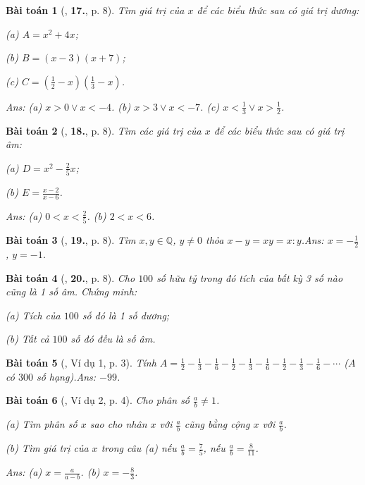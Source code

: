 \documentclass{article}
\numberwithin{equation}{section}
\newtheorem{baitoan}{Bài toán}
\begin{document}
\begin{baitoan}[\cite{Tuyen_Toan_7}, \textbf{17.}, p. 8]
	Tìm giá trị của $x$ để các biểu thức sau có giá trị dương:
	\begin{enumerate*}
		\item[(a)] $A = x^2 + 4x$;
		\item[(b)] $B = (x - 3)(x + 7)$;
		\item[(c)] $C = \left(\frac{1}{2} - x\right)\left(\frac{1}{3} - x\right)$.
	\end{enumerate*}\hfill\textsf{Ans:} (a) $x > 0\lor x < -4$. (b) $x > 3\lor x < -7$. (c) $x < \frac{1}{3}\lor x > \frac{1}{2}$.
\end{baitoan}

\begin{baitoan}[\cite{Tuyen_Toan_7}, \textbf{18.}, p. 8]
	Tìm các giá trị của $x$ để các biểu thức sau có giá trị âm:
	\begin{enumerate*}
		\item[(a)] $D = x^2 - \frac{2}{5}x$;
		\item[(b)] $E = \frac{x - 2}{x - 6}$.
	\end{enumerate*}\hfill\textsf{Ans:} (a) $0 < x < \frac{2}{5}$. (b) $2 < x < 6$.
\end{baitoan}

\begin{baitoan}[\cite{Tuyen_Toan_7}, \textbf{19.}, p. 8]
	Tìm $x,y\in\mathbb{Q}$, $y\ne 0$ thỏa $x - y = xy = x:y$.\hfill\textsf{Ans:} $x = -\frac{1}{2}$, $y = -1$.
\end{baitoan}

\begin{baitoan}[\cite{Tuyen_Toan_7}, \textbf{20.}, p. 8]
	Cho $100$ số hữu tỷ trong đó tích của bất kỳ 3 số nào cũng là 1 số âm. Chứng minh:
	\begin{enumerate*}
		\item[(a)] Tích của $100$ số đó là 1 số dương;
		\item[(b)] Tất cả $100$ số đó đều là số âm.
	\end{enumerate*}
\end{baitoan}

\begin{baitoan}[\cite{Binh_Toan_7_tap_1}, Ví dụ 1, p. 3]
	Tính $A = \frac{1}{2} - \frac{1}{3} - \frac{1}{6} - \frac{1}{2} - \frac{1}{3} - \frac{1}{6} - \frac{1}{2} - \frac{1}{3} - \frac{1}{6} - \cdots$ ($A$ có $300$ số hạng).\hfill\textsf{Ans:} $-99$.
\end{baitoan}

\begin{baitoan}[\cite{Binh_Toan_7_tap_1}, Ví dụ 2, p. 4]
	Cho phân số $\frac{a}{b}\ne 1$.
	\begin{enumerate*}
		\item[(a)] Tìm phân số $x$ sao cho nhân $x$ với $\frac{a}{b}$ cũng bằng cộng $x$ với $\frac{a}{b}$.
		\item[(b)] Tìm giá trị của $x$ trong câu (a) nếu $\frac{a}{b} = \frac{7}{5}$, nếu $\frac{a}{b} = \frac{8}{11}$.
	\end{enumerate*}\hfill\textsf{Ans:} (a) $x = \frac{a}{a - b}$. (b) $x = -\frac{8}{3}$.
\end{baitoan}
\end{document}
